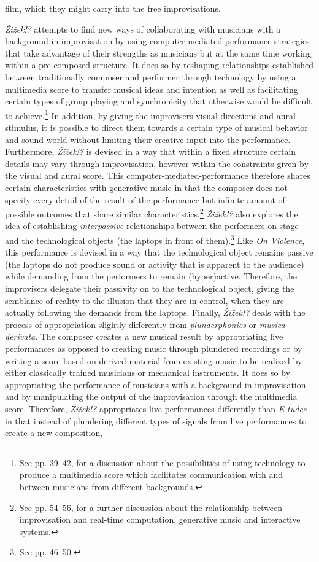film, which they might carry into the free improvisations.

\emph{\v{Z}i\v{z}ek!?} attempts to find new ways of collaborating with musicians with a background in improvisation by using computer-mediated-performance strategies that take advantage of their strengths as musicians but at the same time working within a pre-composed structure. It does so by reshaping relationships established between traditionally composer and performer through technology by using a multimedia score to transfer musical ideas and intention as well as facilitating certain types of group playing and synchronicity that otherwise would be difficult to achieve.\footnote{See \hyperlink{superscore}{pp. 39--42}, for a discussion about the possibilities of using technology to produce a multimedia score which facilitates communication with and between musicians from different backgrounds.} In addition, by giving the improvisers visual directions and aural stimulus, it is possible to direct them towards a certain type of musical behavior and sound world without limiting their creative input into the performance. Furthermore, \emph{\v{Z}i\v{z}ek!?} is devised in a way that within a fixed structure certain details may vary through improvisation, however within the constraints given by the visual and aural score. This computer-mediated-performance therefore shares certain characteristics with generative music in that the composer does not specify every detail of the result of the performance but infinite amount of possible outcomes that share similar characteristics.\footnote{See \hyperlink{realtimepos}{pp. 54--56}, for a further discussion about the relationship between improvisation and real-time computation, generative music and interactive systems.} \emph{\v{Z}i\v{z}ek!?} also explores the idea of establishing \emph{interpassive} relationships between the performers on stage and the technological objects (the laptops in front of them).\footnote{See \hyperlink{interpassiv}{pp. 46--50}.} Like \emph{On Violence}, this performance is devised in a way that the technological object remains passive (the laptops do not produce sound or activity that is apparent to the audience) while demanding from the performers to remain (hyper)active. Therefore, the improvisers delegate their passivity on to the technological object, giving the semblance of reality to the illusion that they are in control, when they are actually following the demands from the laptops. Finally, \emph{\v{Z}i\v{z}ek!?} deals with the process of appropriation slightly differently from \emph{plunderphonics} or \emph{musica derivata}. The composer creates a new musical result by appropriating live performances as opposed to creating music through plundered recordings or by writing a score based on derived material from existing music to be realized by either classically trained musicians or mechanical instruments. It does so by appropriating the performance of musicians with a background in improvisation and by manipulating the output of the improvisation through the multimedia score. Therefore, \emph{\v{Z}i\v{z}ek!?} appropriates live performances differently than \emph{E-tudes} in that instead of plundering different types of signals from live performances to create a new composition, 